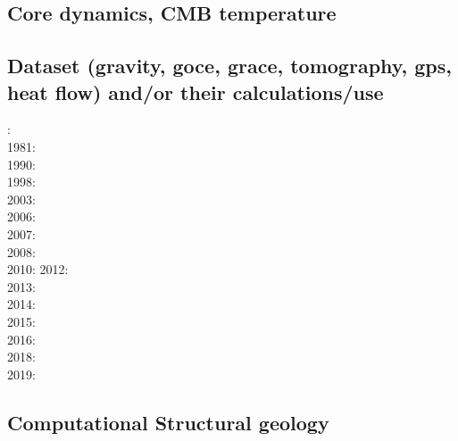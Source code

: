 \subsection*{Core dynamics, CMB temperature}
 

\noindent
\cite{hayu96}
\cite{lahb08}\cite{gost08}
\cite{kisn09}
\cite{nata10}
\cite{yiym19}

\subsection*{Dataset (gravity, goce, grace, tomography, gps, heat flow) 
and/or their calculations/use}
    

: \cite{rola77}\\
1981: \cite{dzan81}\\
1990: \cite{lips90}\\
1998: \cite{bisp98}\\
2003: \cite{krhh03}\cite{sosi03}\cite{pimo03}\\
2006: \cite{masr06}\\
2007: \cite{mitk07}\cite{lobc07}\cite{rimb07}\\
2008: \cite{zhou08}\cite{zhou08}\\
2010: \cite{dada10}
2012: \cite{hawj12}\cite{resa12}\cite{hawj12}\cite{fesw12}\\
2013: \cite{ress13}\cite{ebbf13}\cite{davi13}\\
2014: \cite{paml14}\cite{ebbf14}\cite{krbk14}\\
2015: \cite{boem15}\cite{brrs15}\\
2016: \cite{kord16}\cite{moek16}\\
2018: \cite{pabn18}\cite{hamp18}\\
2019: \cite{sopg19}

\subsection*{Computational Structural geology}

